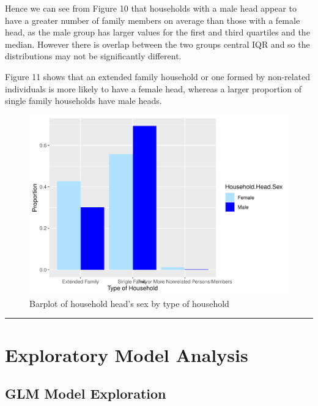 \documentclass[
]{article}
\begin{document}
Hence we can see from Figure 10 that households with a male head appear
to have a greater number of family members on average than those with a
female head, as the male group has larger values for the first and third
quartiles and the median. However there is overlap between the two
groups central IQR and so the distributions may not be significantly
different.

Figure 11 shows that an extended family household or one formed by
non-related individuals is more likely to have a female head, whereas a
larger proportion of single family households have male heads.

\begin{figure}[H]

{\centering \includegraphics[width=0.8\linewidth]{Group_01_files/figure-latex/barplot of sex by type of household-1} 

}

\caption{Barplot of household head's sex by type of household}\label{fig:barplot of sex by type of household}
\end{figure}

\begin{center}\rule{0.5\linewidth}{0.5pt}\end{center}

\newpage

\hypertarget{sec:EMA}{%
\section{Exploratory Model Analysis}\label{sec:EMA}}

\hypertarget{glm-model-exploration}{%
\subsection{GLM Model Exploration}\label{glm-model-exploration}}
\end{document}
